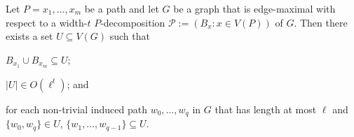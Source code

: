 \documentclass[kpfonts]{patmorin}
\theoremstyle{named}
\begin{document}
\begin{lem}\label{path-induced}
    Let $P=x_1,\ldots,x_m$ be a path and let $G$ be a graph that is edge-maximal with respect to a width-$t$ $P$-decomposition $\mathcal{P}:=(B_x:x\in V(P))$ of $G$.  Then there exists a set $U\subseteq V(G)$ such that
    \begin{compactenum}[(Z1)]
        \item $B_{x_1}\cup B_{x_m}\subseteq U$;\label{values-u}
        \item $|U|\in O(\ell^t)$; and \label{size-u}
        \item for each non-trivial induced path $w_0,\ldots,w_q$ in $G$ that has length at most $\ell$ and $\{w_0,w_q\}\in U$, $\{w_1,\ldots,w_{q-1}\}\subseteq U$.\label{induced-u}
    \end{compactenum}
\end{lem}
\end{document}
